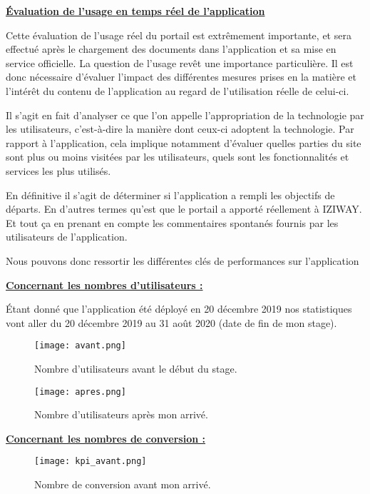 \textbf{\underline{Évaluation de l’usage en temps réel de l’application}}

Cette évaluation de l’usage réel du portail est extrêmement importante, et sera effectué après le chargement des documents dans l’application et sa mise en service officielle. La question de l’usage revêt une importance particulière. Il est donc nécessaire d’évaluer l’impact des différentes mesures prises en la matière et l’intérêt du contenu de l’application au regard de l’utilisation réelle de celui-ci. 

Il s’agit en fait d’analyser ce que l’on appelle l’appropriation de la technologie par les utilisateurs, c’est-à-dire la manière dont ceux-ci adoptent la technologie. Par rapport à l’application, cela implique notamment d’évaluer quelles parties du site sont plus ou moins visitées par les utilisateurs, quels sont les fonctionnalités et services les plus utilisés. 

En définitive il s’agit de déterminer si l’application a rempli les objectifs de départs. En d’autres termes qu’est que le portail a apporté réellement à IZIWAY. Et tout ça en prenant en compte les commentaires spontanés fournis par les utilisateurs de l’application. 

Nous pouvons donc ressortir les différentes clés de performances sur l’application

\textbf{\underline{Concernant les nombres d'utilisateurs :}}

Étant donné que l’application été déployé en 20 décembre 2019 nos statistiques vont aller du 20 décembre 2019 au 31 août 2020 (date de fin de mon stage).

\begin{figure}[H]
	\centering
	\texttt{[image: avant.png]}
	\caption{Nombre d'utilisateurs avant le début du stage.}
	\label{fig:sp0}
\end{figure}

\begin{figure}[H]
	\centering
	\texttt{[image: apres.png]}
	\caption{Nombre d'utilisateurs après mon arrivé.}
	\label{fig:sp0}
\end{figure}

\textbf{\underline{Concernant les nombres de conversion :}}

\begin{figure}[H]
	\centering
	\texttt{[image: kpi\_avant.png]}
	\caption{Nombre de conversion avant mon arrivé.}
	\label{fig:sp0}
\end{figure}

